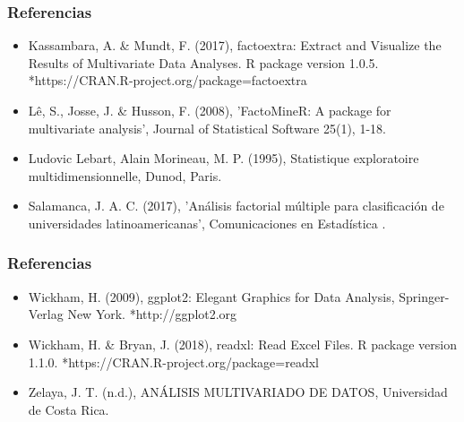 \documentclass[12pt]{beamer}
\begin{document}
\begin{frame}
\frametitle{Referencias}
\begin{itemize}
\item Kassambara, A. \& Mundt, F. (2017), factoextra: Extract and Visualize the Results of Multivariate
Data Analyses. R package version 1.0.5.
*https://CRAN.R-project.org/package=factoextra


\item Lê, S., Josse, J. \& Husson, F. (2008), 'FactoMineR: A package for multivariate analysis', Journal
of Statistical Software 25(1), 1-18.


\item Ludovic Lebart, Alain Morineau, M. P. (1995), Statistique exploratoire multidimensionnelle, Dunod,
Paris.

\item Salamanca, J. A. C. (2017), 'Análisis factorial múltiple para clasificación de universidades latinoamericanas', Comunicaciones en Estadística .
\end{itemize}
\end{frame}

\begin{frame}
\frametitle{Referencias}
\begin{itemize}
\item Wickham, H. (2009), ggplot2: Elegant Graphics for Data Analysis, Springer-Verlag New York.
*http://ggplot2.org


\item Wickham, H. \& Bryan, J. (2018), readxl: Read Excel Files. R package version 1.1.0.
*https://CRAN.R-project.org/package=readxl


\item Zelaya, J. T. (n.d.), ANÁLISIS MULTIVARIADO DE DATOS, Universidad de Costa Rica.
\end{itemize}
\end{frame}
\end{document}
